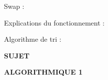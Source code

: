 \documentclass[11pt,a4paper]{article}
\newcommand{\TitreMatiere}{Algorithmique 1}
\begin{document}
\vfillFirst

\begin{center}
Swap :
\end{center}

\vfillLast

\clearpage

\vfillFirst

\begin{center}
Explications du fonctionnement :

\medskip

Algorithme de tri :
\end{center}

\vfillLast

\newpage




\vfillFirst

\begin{center}

\begin{LARGE}
\textbf{SUJET}

\bigskip

\textbf{\MakeUppercase{\TitreMatiere}}
\end{LARGE}

\end{center}

\vfillLast
\end{document}
